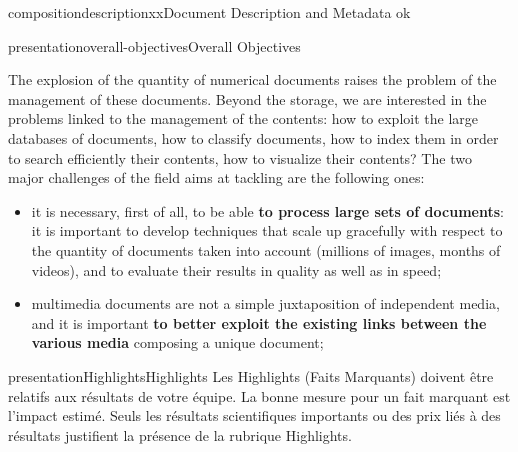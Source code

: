 \documentclass{ra2011}
\begin{document}
\begin{module}{composition}{descriptionxx}{Document Description and Metadata}
ok
\end{module}


\begin{module}{presentation}{overall-objectives}{Overall Objectives}

  The explosion of the quantity of numerical documents raises the problem
  of the management of these documents. Beyond the storage,
  we are interested in the problems linked to the management of the contents: 
  how to exploit the large databases of documents, how to classify documents, how to
  index them in order to search efficiently their contents, how to visualize
  their contents? 
  The two major challenges of the field  aims at tackling are the following ones:
  \begin{itemize} 
  \item it is necessary, first of all, to be able {\bf to
      process large sets of documents}: it is important to develop techniques
    that scale up gracefully with respect to the quantity of documents
    taken into account (millions of images, months of videos), and to evaluate
    their results in quality as well as in speed;
    
  \item  multimedia documents are not a simple juxtaposition of
    independent media, and it is important {\bf to better exploit the
      existing links between the various media} composing a unique
    document;
  \end{itemize}
\end{module}

\begin{module}{presentation}{Highlights}{Highlights}
Les  Highlights (Faits Marquants) doivent être relatifs aux résultats de votre équipe. La bonne mesure pour un fait marquant est l'impact estimé. Seuls les résultats scientifiques importants ou des prix liés à des résultats justifient la présence de la rubrique Highlights.
\end{module}
\end{document}
